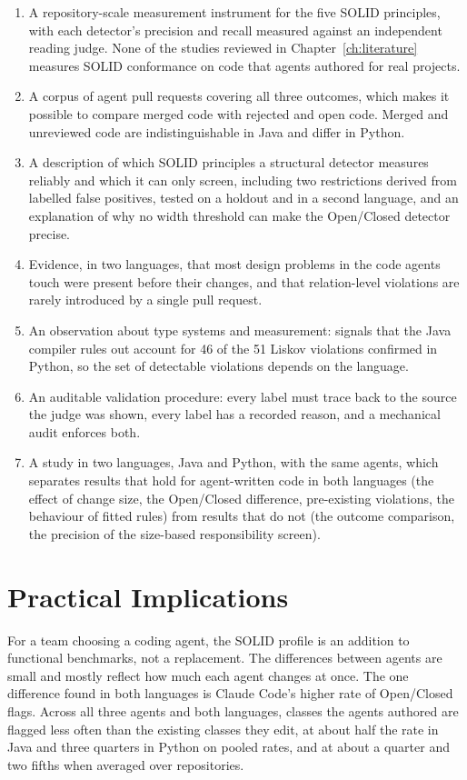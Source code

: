 \begin{enumerate}[label=\textbf{C\arabic*.}, leftmargin=1.6cm]
  \item A repository-scale measurement instrument for the five SOLID principles, with each
  detector's precision and recall measured against an independent reading judge. None of the studies
  reviewed in Chapter~\ref{ch:literature} measures SOLID conformance on code that agents authored for
  real projects.
  \item A corpus of agent pull requests covering all three outcomes, which makes it possible to
  compare merged code with rejected and open code. Merged and unreviewed code are indistinguishable
  in Java and differ in Python.
  \item A description of which SOLID principles a structural detector measures reliably and which it
  can only screen, including two restrictions derived from labelled false positives, tested on a
  holdout and in a second language, and an explanation of why no width threshold can make the
  Open/Closed detector precise.
  \item Evidence, in two languages, that most design problems in the code agents touch were present
  before their changes, and that relation-level violations are rarely introduced by a single pull
  request.
  \item An observation about type systems and measurement: signals that the Java compiler rules out
  account for 46 of the 51 Liskov violations confirmed in Python, so the set of detectable violations
  depends on the language.
  \item An auditable validation procedure: every label must trace back to the source the judge was
  shown, every label has a recorded reason, and a mechanical audit enforces both.
  \item A study in two languages, Java and Python, with the same agents, which separates results that hold
  for agent-written code in both languages (the effect of change size, the Open/Closed difference,
  pre-existing violations, the behaviour of fitted rules) from results that do not (the outcome
  comparison, the precision of the size-based responsibility screen).
\end{enumerate}

\section{Practical Implications}
\label{sec:practical}

For a team choosing a coding agent, the SOLID profile is an addition to functional benchmarks, not a
replacement. The differences between agents are small and mostly reflect how much each agent changes
at once. The one difference found in both languages is Claude Code's higher rate of Open/Closed flags.
Across all three agents and both languages, classes the agents authored are flagged less often than
the existing classes they edit, at about half the rate in Java and three quarters in Python on pooled rates, and at about a quarter and two fifths when averaged over repositories.

